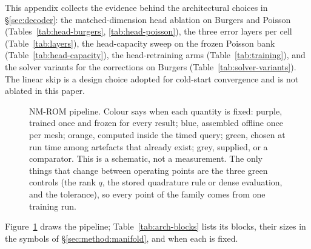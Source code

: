 This appendix collects the evidence behind the architectural choices in
\S\ref{sec:decoder}: the matched-dimension head ablation on Burgers and
Poisson (Tables~\ref{tab:head-burgers}, \ref{tab:head-poisson}), the three
error layers per cell (Table~\ref{tab:layers}), the head-capacity sweep on the
frozen Poisson bank (Table~\ref{tab:head-capacity}), the head-retraining arms
(Table~\ref{tab:training}), and the solver variants for the corrections on
Burgers (Table~\ref{tab:solver-variants}). The linear skip is a design choice
adopted for cold-start convergence and is not ablated in this paper.
\begin{figure}[h]
\centering
\resizebox{0.9\linewidth}{!}{}
\caption{NM-ROM pipeline. Colour says when each quantity is fixed:
purple, trained once and frozen for every result; blue, assembled
offline once per mesh; orange, computed inside the timed query; green,
chosen at run time among artefacts that already exist; grey, supplied,
or a comparator. This is a schematic, not a measurement. The only things
that change between operating points are the three green controls (the
rank $q$, the stored quadrature rule or dense evaluation, and the
tolerance), so every point of the family comes from one training run.}
\label{fig:arch}
\end{figure}

Figure~\ref{fig:arch} draws the pipeline;
Table~\ref{tab:arch-blocks} lists its blocks, their sizes in the symbols of
\S\ref{sec:method:manifold}, and when each is fixed.

